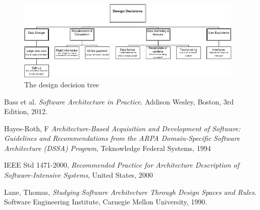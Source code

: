 \documentclass{article}
\begin{document}
\begin{figure}[!ht]
\includegraphics[width= 410px]{DDTree}
\caption{The design decision tree}
\label{fig:ddtree}
\end{figure}

\setcounter{table}{0}

\clearpage

\newpage

%
\newpage

%
\newpage

\newpage

\newpage

\newpage

\newpage

\newpage

\newpage


\clearpage

\clearpage


\clearpage
\begin{thebibliography}{9}

Bass et al.
  \emph{Software Architecture in Practice}.
  Addison Wesley, Boston,
  3rd Edition,
  2012.

 Hayes-Roth, F
 \emph{Architecture-Based Acquisition and Development of Software: Guidelines and Recommendations from the ARPA Domain-Speciﬁc
 Software Architecture (DSSA) Program},
 Teknowledge Federal Systems,
 1994

 IEEE Std 1471-2000,
 \emph{Recommended Practice for Architecture Description of Software-Intensive Systems},
 United States,
 2000

  Lane, Thomas,
  \emph{Studying Software Architecture Through Design Spaces and Rules}.
  Software Engineering Institute, Carnegie Mellon University,
  1990.

\end{thebibliography}
\end{document}
